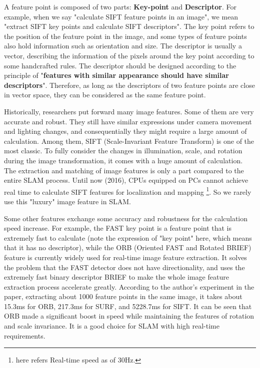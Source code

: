 A feature point is composed of two parts: \textbf{Key-point} and \textbf{Descriptor}. For example, when we say "calculate SIFT feature points in an image", we mean "extract SIFT key points and calculate SIFT descriptors". The key point refers to the position of the feature point in the image, and some types of feature points also hold information such as orientation and size. The descriptor is usually a vector, describing the information of the pixels around the key point according to some handcrafted rules. The descriptor should be designed according to the principle of "\textbf{features with similar appearance should have similar descriptors}". Therefore, as long as the descriptors of two feature points are close in vector space, they can be considered as the same feature point.

Historically, researchers put forward many image features. Some of them are very accurate and robust. They still have similar expressions under camera movement and lighting changes, and consequentially they might require a large amount of calculation. Among them, SIFT (Scale-Invariant Feature Transform) is one of the most classic. To fully consider the changes in illumination, scale, and rotation during the image transformation, it comes with a huge amount of calculation. The extraction and matching of image features is only a part compared to the entire SLAM process. Until now (2016), CPUs equipped on PCs cannot achieve real time to calculate SIFT features for localization and mapping \footnote{here refers Real-time speed as of 30Hz. }. So we rarely use this "luxury" image feature in SLAM.

Some other features exchange some accuracy and robustness for the calculation speed increase. For example, the FAST key point is a feature point that is extremely fast to calculate (note the expression of "key point" here, which means that it has no descriptor), while the ORB (Oriented FAST and Rotated BRIEF) feature is currently widely used for real-time image feature extraction. It solves the problem that the FAST detector \textsuperscript{\cite{Rosten2006}} does not have directionality, and uses the extremely fast binary descriptor BRIEF\textsuperscript{\cite{calonder2010brief}} to make the whole image feature extraction process accelerate greatly. According to the author's experiment in the paper, extracting about 1000 feature points in the same image, it takes about 15.3ms for ORB, 217.3ms for SURF, and 5228.7ms for SIFT. It can be seen that ORB made a significant boost in speed while maintaining the features of rotation and scale invariance. It is a good choice for SLAM with high real-time requirements.

